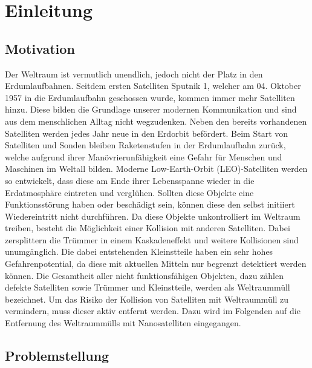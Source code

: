 \chapter{Einleitung}
		\section{Motivation}

\begin{flushleft}
		Der Weltraum ist vermutlich unendlich, jedoch nicht der Platz in den Erdumlaufbahnen. Seitdem ersten Satelliten Sputnik 1, welcher am 04. Oktober 1957 in die Erdumlaufbahn geschossen wurde, kommen immer mehr Satelliten hinzu. Diese bilden die Grundlage unserer modernen Kommunikation und sind aus dem menschlichen Alltag nicht wegzudenken.
Neben den bereits vorhandenen Satelliten werden jedes Jahr neue in den Erdorbit befördert. Beim Start von Satelliten und Sonden bleiben Raketenstufen in der Erdumlaufbahn zurück, welche aufgrund ihrer Manövrierunfähigkeit eine Gefahr für Menschen und Maschinen im Weltall bilden. Moderne Low-Earth-Orbit (LEO)-Satelliten werden so entwickelt, dass diese am Ende ihrer Lebensspanne wieder in die Erdatmosphäre eintreten und verglühen. 
Sollten diese Objekte eine Funktionsstörung haben oder beschädigt sein, können diese den selbst initiiert Wiedereintritt nicht durchführen. Da diese Objekte unkontrolliert im Weltraum treiben, besteht die Möglichkeit einer Kollision mit anderen Satelliten. Dabei zersplittern die Trümmer in einem Kaskadeneffekt und weitere Kollisionen sind unumgänglich. Die dabei entstehenden Kleinstteile haben ein sehr hohes Gefahrenpotential, da diese mit aktuellen Mitteln nur begrenzt detektiert werden können. 
Die Gesamtheit aller nicht funktionsfähigen Objekten, dazu zählen defekte Satelliten sowie Trümmer und Kleinstteile, werden als Weltraummüll bezeichnet. Um das Risiko der Kollision von Satelliten mit 		 Weltraummüll zu vermindern, muss dieser aktiv entfernt werden. Dazu wird im Folgenden auf die Entfernung des Weltraummülls mit Nanosatelliten eingegangen.
\end{flushleft}

		\section{Problemstellung}

